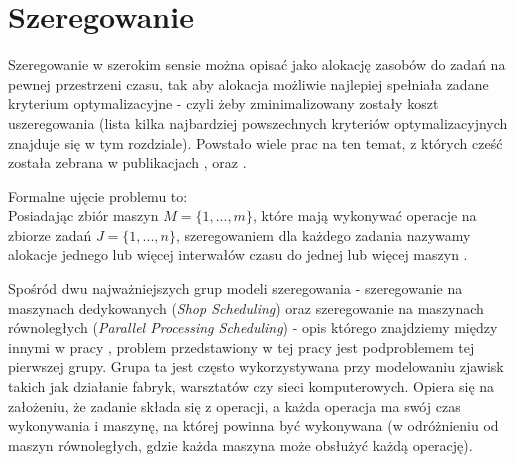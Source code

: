 \documentclass[brudnopis]{xmgr}
\begin{document}
\section{Szeregowanie}
Szeregowanie w szerokim sensie można opisać jako alokację zasobów do zadań na pewnej przestrzeni czasu, tak aby alokacja możliwie najlepiej spełniała zadane kryterium optymalizacyjne - czyli żeby zminimalizowany zostały koszt uszeregowania (lista kilka najbardziej powszechnych kryteriów optymalizacyjnych znajduje się w tym rozdziale). Powstało wiele prac na ten temat, z których cześć została zebrana w publikacjach \cite{graves1981review}, \cite{lawler1993sequencing} oraz \cite{lee1997current}.
\medskip

Formalne ujęcie problemu to:\\
Posiadając zbiór maszyn $M=\{1,...,m\}$, które mają wykonywać operacje na zbiorze zadań $J=\{1,...,n\}$, szeregowaniem dla każdego zadania nazywamy alokacje jednego lub więcej interwałów czasu do jednej lub więcej maszyn \cite{brucker1999scheduling}.
\medskip


Spośród dwu najważniejszych grup modeli szeregowania - szeregowanie na maszynach dedykowanych (\emph{Shop Scheduling}) oraz szeregowanie na maszynach równoległych (\emph{Parallel Processing Scheduling}) - opis którego znajdziemy między innymi w pracy \cite{drozdowski2009scheduling}, problem przedstawiony w tej pracy jest podproblemem tej pierwszej grupy. Grupa ta jest często wykorzystywana przy modelowaniu zjawisk takich jak działanie fabryk, warsztatów czy sieci komputerowych.
Opiera się na założeniu, że zadanie składa się z operacji, a każda operacja ma swój czas wykonywania i maszynę, na której powinna być wykonywana (w odróżnieniu od maszyn równoległych, gdzie każda maszyna może obsłużyć każdą operację).
\medskip
\end{document}
